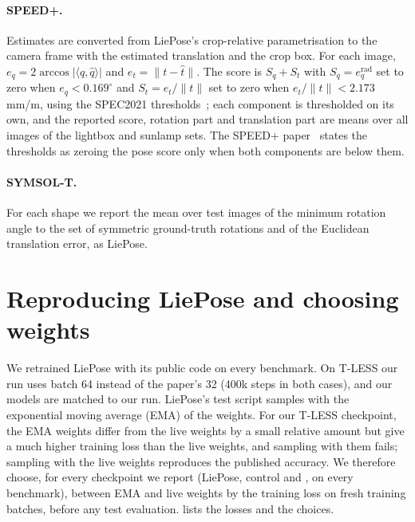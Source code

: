 \paragraph{SPEED+.}
Estimates are converted from LiePose's crop-relative parametrisation to the camera frame with the estimated translation and the crop
box. For each image, $e_q=2\arccos|\langle q,\hat q\rangle|$ and $e_t=\|t-\hat t\|$. The score is $S_q+S_t$ with
$S_q=e_q^{\mathrm{rad}}$ set to zero when $e_q<0.169^\circ$ and $S_t=e_t/\|t\|$ set to zero when $e_t/\|t\|<2.173$\,mm/m, using the
SPEC2021 thresholds~\cite{park2022speedplus}; each component is thresholded on its own, and the reported score, rotation part and
translation part are means over all images of the lightbox and sunlamp sets. The SPEED+ paper~\cite{park2022speedplus} states the
thresholds as zeroing the pose score only when both components are below them. 

\paragraph{SYMSOL-T.}
For each shape we report the mean over test images of the minimum rotation angle to the set of symmetric ground-truth rotations and of
the Euclidean translation error, as LiePose. 

\section{Reproducing LiePose and choosing weights}
\label{sec:supp-repro}

We retrained LiePose with its public code on every benchmark. On T-LESS our run uses batch 64 instead of the paper's 32 (400k steps
in both cases), and our models are matched to our run. LiePose's test script samples with the exponential moving average (EMA) of the
weights. For our T-LESS checkpoint, the EMA weights differ from the live weights by a small relative amount but give a much higher
training loss than the live weights, and sampling with them fails; sampling with the live weights reproduces the published accuracy.
We therefore choose, for every checkpoint we report (LiePose, control and \method, on every benchmark), between EMA and live weights by
the training loss on fresh training batches, before any test evaluation.  lists the losses and the choices.

